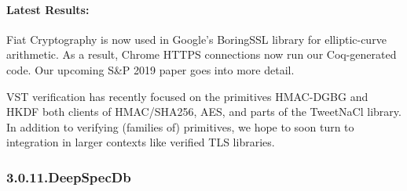 \documentclass[12pt,twoside]{article}
\begin{document}
\paragraph{Latest Results:}\label{sec-latest-results-}%

\noindent{}Fiat Cryptography is now used in Google's BoringSSL library for
elliptic-curve arithmetic.  As a result, Chrome HTTPS connections now
run our Coq-generated code.  Our  upcoming S\&P 2019 paper goes into
more detail.%

VST verification has recently focused on the primitives HMAC-DGBG and
HKDF \textendash{} both clients of HMAC/SHA256, AES, and parts of the TweetNaCl
library. In addition to verifying (families of) primitives, we hope to
soon turn to integration in larger contexts like verified TLS
libraries.%

\subsubsection{3.0.11.\hspace*{0.5em}DeepSpecDb}\label{sec-deepspecdb}%
\end{document}
